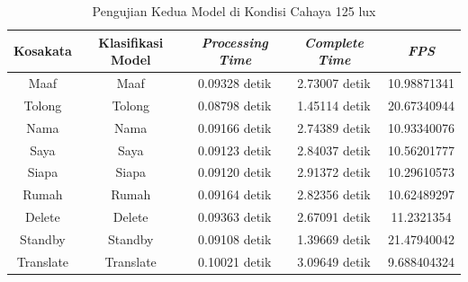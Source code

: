 \begin{longtable}{|c|c|c|c|c|}
  \caption{Pengujian Kedua Model di Kondisi Cahaya 125 lux}
  \label{tb:prediksiterang2}                                   \\
  \hline
  \rowcolor[HTML]{C0C0C0}
  \textbf{Kosakata} & \textbf{Klasifikasi Model} & \textbf{\emph{Processing Time}} & \textbf{\emph{Complete Time}} & \textbf{\emph{FPS}}\\
  \hline
  Maaf              & Maaf                        & 0.09328 detik                           & 2.73007 detik                                 & 10.98871341\\
  Tolong            & Tolong                      & 0.08798 detik                           & 1.45114 detik                                 & 20.67340944\\
  Nama              & Nama                        & 0.09166 detik                           & 2.74389 detik                                 & 10.93340076\\
  Saya              & Saya                        & 0.09123 detik                           & 2.84037 detik                                 & 10.56201777\\
  Siapa             & Siapa                       & 0.09120 detik                           & 2.91372 detik                                 & 10.29610573\\
  Rumah             & Rumah                       & 0.09164 detik                           & 2.82356 detik                                 & 10.62489297\\
  Delete            & Delete                      & 0.09363 detik                           & 2.67091 detik                                 & 11.2321354\\
  Standby           & Standby                     & 0.09108 detik                           & 1.39669 detik                                 & 21.47940042\\
  Translate         & Translate                   & 0.10021 detik                           & 3.09649 detik                                 & 9.688404324\\
  \hline
\end{longtable}


